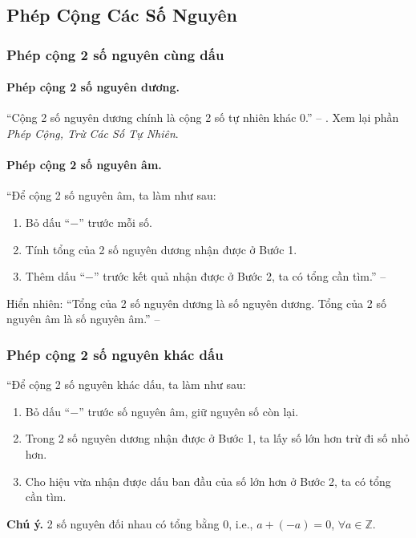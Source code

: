 \documentclass{article}
\numberwithin{equation}{section}
\begin{document}
\subsection{Phép Cộng Các Số Nguyên}

\subsubsection{Phép cộng 2 số nguyên cùng dấu}

\paragraph{Phép cộng 2 số nguyên dương.} ``Cộng 2 số nguyên dương chính là cộng 2 số tự nhiên khác 0.'' -- \cite[p. 70]{Thai_Anh_Dat_Ha_Loan_Nam_Quang_Toan_6_tap_1}. Xem lại phần \textit{Phép Cộng, Trừ Các Số Tự Nhiên}.

\paragraph{Phép cộng 2 số nguyên âm.} ``Để cộng 2 số nguyên âm, ta làm như sau:
\begin{enumerate}
	\item Bỏ dấu ``$-$'' trước mỗi số.
	\item Tính tổng của 2 số nguyên dương nhận được ở Bước 1.
	\item Thêm dấu ``$-$'' trước kết quả nhận được ở Bước 2, ta có tổng cần tìm.'' -- \cite[p. 71]{Thai_Anh_Dat_Ha_Loan_Nam_Quang_Toan_6_tap_1}
\end{enumerate}
Hiển nhiên: ``Tổng của 2 số nguyên dương là số nguyên dương. Tổng của 2 số nguyên âm là số nguyên âm.'' -- \cite[p. 71]{Thai_Anh_Dat_Ha_Loan_Nam_Quang_Toan_6_tap_1}

\subsubsection{Phép cộng 2 số nguyên khác dấu}
``Để cộng 2 số nguyên khác dấu, ta làm như sau:
\begin{enumerate}
	\item Bỏ dấu ``$-$'' trước số nguyên âm, giữ nguyên số còn lại.
	\item Trong 2 số nguyên dương nhận được ở Bước 1, ta lấy số lớn hơn trừ đi số nhỏ hơn.
	\item Cho hiệu vừa nhận được dấu ban đầu của số lớn hơn ở Bước 2, ta có tổng cần tìm.
\end{enumerate}
\textbf{Chú ý.} 2 số nguyên đối nhau có tổng bằng 0, i.e., $a + (-a) = 0$, $\forall a\in\mathbb{Z}$.
\end{document}
